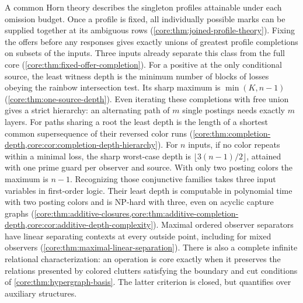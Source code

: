 A common Horn theory describes the singleton profiles attainable under
each omission budget. Once a profile is fixed, all individually possible
marks can be supplied together at its ambiguous rows
(\cref{core:thm:joined-profile-theory}). Fixing the offers before any
responses gives exactly unions of greatest profile completions on
subsets of the inputs. Three inputs already separate this class from
the full core (\cref{core:thm:fixed-offer-completion}). For a positive at the only
conditional source, the least witness depth is the minimum number of
blocks of losses obeying the rainbow intersection test. Its sharp maximum is $\min(K,n-1)$
(\cref{core:thm:one-source-depth}). Even iterating
these completions with free union gives a strict hierarchy: an alternating
path of $m$ single postings needs exactly $m$ layers. For paths sharing
a root the least depth is the length of a shortest common supersequence
of their reversed color runs (\cref{core:thm:completion-depth,core:cor:completion-depth-hierarchy}).
For $n$ inputs, if no color repeats within a minimal loss, the sharp
worst-case depth is
$\lfloor 3(n-1)/2\rfloor$, attained with one prime guard per observer
and source. With only two posting colors the maximum is $n-1$.
Recognizing those conjunctive families takes three input
variables in first-order logic. Their least depth is computable in
polynomial time with two posting colors and is NP-hard with three,
even on acyclic capture graphs
(\cref{core:thm:additive-closures,core:thm:additive-completion-depth,core:cor:additive-depth-complexity}).
Maximal ordered observer separators have
linear separating contexts at every outside point, including for mixed
observers (\cref{core:thm:maximal-linear-separation}). There is also a complete infinite
relational characterization: an operation is core exactly when it
preserves the relations presented by colored clutters satisfying the
boundary and cut conditions of \cref{core:thm:hypergraph-basis}.
The latter criterion is closed, but quantifies over auxiliary structures.

